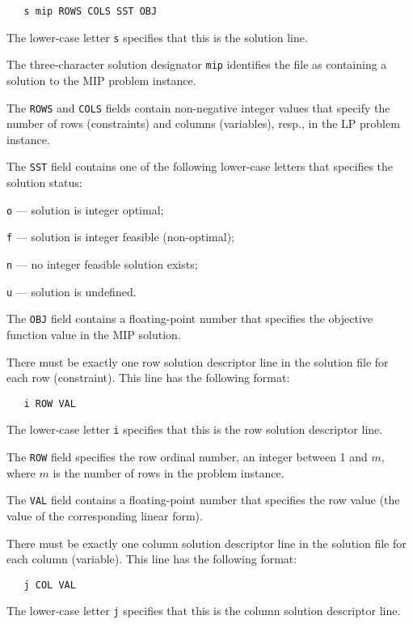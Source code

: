 \begin{verbatim}
   s mip ROWS COLS SST OBJ
\end{verbatim}

The lower-case letter \verb|s| specifies that this is the solution
line.

The three-character solution designator \verb|mip| identifies the file
as containing a solution to the MIP problem instance.

The \verb|ROWS| and \verb|COLS| fields contain non-negative integer
values that specify the number of rows (constraints) and columns
(variables), resp., in the LP problem instance.

The \verb|SST| field contains one of the following lower-case letters
that specifies the solution status:

\verb|o| --- solution is integer optimal;

\verb|f| --- solution is integer feasible (non-optimal);

\verb|n| --- no integer feasible solution exists;

\verb|u| --- solution is undefined.

The \verb|OBJ| field contains a floating-point number that specifies
the objective function value in the MIP solution.

 There must be exactly one row solution
descriptor line in the solution file for each row (constraint). This
line has the following format:

\begin{verbatim}
   i ROW VAL
\end{verbatim}

The lower-case letter \verb|i| specifies that this is the row solution
descriptor line.

The \verb|ROW| field specifies the row ordinal number, an integer
between 1 and $m$, where $m$ is the number of rows in the problem
instance.

The \verb|VAL| field contains a floating-point number that specifies
the row value (the value of the corresponding linear form).

 There must be exactly one column
solution descriptor line in the solution file for each column
(variable). This line has the following format:

\begin{verbatim}
   j COL VAL
\end{verbatim}

The lower-case letter \verb|j| specifies that this is the column
solution descriptor line.

